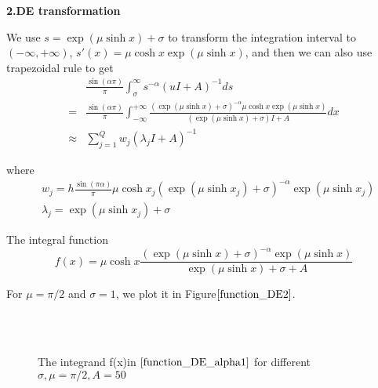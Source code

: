 \textbf{ 2.DE transformation}

We use $s=\exp(\mu \sinh x)+\sigma$ to transform the integration interval to $(-\infty,+\infty)$, $s'(x)=\mu\cosh x \exp(\mu \sinh x)$, and then we can also use trapezoidal rule to get
\begin{equation}
  \begin{aligned}
&\frac{\sin(\alpha \pi)}{\pi}\int_{\sigma}^{\infty}s^{-\alpha}(u{I}+{A})^{-1}ds\\
=&\frac{\sin(\alpha \pi)}{\pi}\int_{-\infty}^{+\infty}\frac{(\exp(\mu \sinh x)+\sigma)^{-\alpha}\mu\cosh x\exp(\mu \sinh x)}{(\exp(\mu \sinh x)+\sigma){I}+A}dx\\
 \approx & \sum_{j=1}^{Q}w_j(\lambda_jI+A)^{-1}
  \end{aligned}
  \label{DE_2}
\end{equation}

where
\begin{equation}
\begin{aligned}
&w_j=h \frac{\sin(\pi \alpha)}{\pi}\mu\cosh x_j(\exp(\mu \sinh x_j)+\sigma)^{-\alpha}\exp(\mu \sinh x_j)\\
&\lambda_j=\exp(\mu \sinh x_j)+\sigma
\end{aligned}
\end{equation}

 The integral function
\begin{equation}
f(x)=\mu\cosh x\frac{(\exp(\mu \sinh x)+\sigma)^{-\alpha}\exp(\mu \sinh x)}{\exp(\mu \sinh x)+\sigma+A}
\label{function_DE_alpha1}
\end{equation}

For $\mu=\pi/2$ and $\sigma=1$, we plot it in Figure$\ref{function_DE2}$.

\begin{figure}[htbp]
\centering
{}
~~
~~
\\
~~
~~
  \caption{The integrand f(x)in $\eqref{function_DE_alpha1}$ for different $\sigma,\mu=\pi/2,A=50$}
  \label{function_DE2}
\end{figure}



